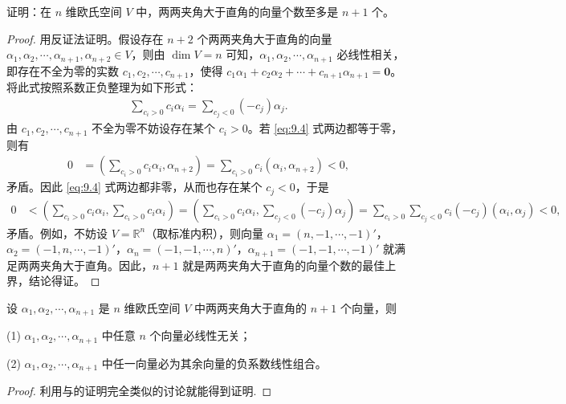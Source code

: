 \documentclass[../../main.tex]{subfiles}
\begin{document}
\begin{proposition}\label{proposition:例9.6}
证明：在 $n$ 维欧氏空间 $V$ 中，两两夹角大于直角的向量个数至多是 $n + 1$ 个。
\end{proposition}
\begin{proof}
用反证法证明。假设存在 $n + 2$ 个两两夹角大于直角的向量 $\alpha_1,\alpha_2,\cdots,\alpha_{n + 1},\alpha_{n + 2}\in V$，则由 $\dim V = n$ 可知，$\alpha_1,\alpha_2,\cdots,\alpha_{n + 1}$ 必线性相关，即存在不全为零的实数 $c_1,c_2,\cdots,c_{n + 1}$，使得 $c_1\alpha_1 + c_2\alpha_2 + \cdots + c_{n + 1}\alpha_{n + 1} = \mathbf{0}$。将此式按照系数正负整理为如下形式：
\begin{align}
\sum_{c_i > 0}c_i\alpha_i = \sum_{c_j < 0}(-c_j)\alpha_j.\label{eq:9.4}
\end{align}
由 $c_1,c_2,\cdots,c_{n + 1}$ 不全为零不妨设存在某个 $c_i > 0$。若 \eqref{eq:9.4} 式两边都等于零，则有
\begin{align*}
0&=(\sum_{c_i > 0}c_i\alpha_i,\alpha_{n + 2})=\sum_{c_i > 0}c_i(\alpha_i,\alpha_{n + 2})<0,
\end{align*}
矛盾。因此 \eqref{eq:9.4} 式两边都非零，从而也存在某个 $c_j < 0$，于是
\begin{align*}
0&<(\sum_{c_i > 0}c_i\alpha_i,\sum_{c_i > 0}c_i\alpha_i)=(\sum_{c_i > 0}c_i\alpha_i,\sum_{c_j < 0}(-c_j)\alpha_j)=\sum_{c_i > 0}\sum_{c_j < 0}c_i(-c_j)(\alpha_i,\alpha_j)<0,
\end{align*}
矛盾。例如，不妨设 $V = \mathbb{R}^n$（取标准内积），则向量 $\alpha_1 = (n,-1,\cdots,-1)'$，$\alpha_2 = (-1,n,\cdots,-1)'$，$\alpha_n = (-1,-1,\cdots,n)'$，$\alpha_{n + 1} = (-1,-1,\cdots,-1)'$ 就满足两两夹角大于直角。因此，$n + 1$ 就是两两夹角大于直角的向量个数的最佳上界，结论得证。 
\end{proof}

\begin{corollary}\label{corollary:例9.6}
设 $\alpha_1,\alpha_2,\cdots,\alpha_{n + 1}$ 是 $n$ 维欧氏空间 $V$ 中两两夹角大于直角的 $n + 1$ 个向量，则

(1) $\alpha_1,\alpha_2,\cdots,\alpha_{n + 1}$ 中任意 $n$ 个向量必线性无关；

(2) $\alpha_1,\alpha_2,\cdots,\alpha_{n + 1}$ 中任一向量必为其余向量的负系数线性组合。
\end{corollary}
\begin{proof}
利用与的证明完全类似的讨论就能得到证明.
\end{proof}
\end{document}
